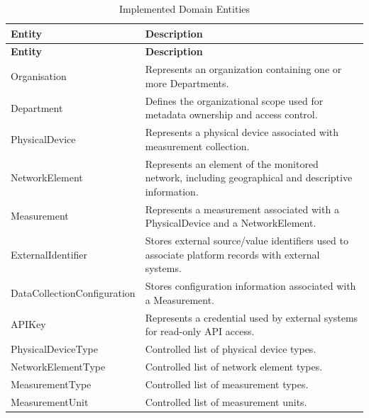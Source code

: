 \documentclass[11pt,a4paper]{article}
\begin{document}
\begin{longtable}{P{4.3cm} P{10.8cm}}
\caption{Implemented Domain Entities}
\label{tab:phase3_entities}\\

\toprule
\textbf{Entity} & \textbf{Description} \\
\midrule
\endfirsthead

\toprule
\textbf{Entity} & \textbf{Description} \\
\midrule
\endhead

\bottomrule
\endfoot

Organisation &
Represents an organization containing one or more
Departments. \\

Department &
Defines the organizational scope used for metadata
ownership and access control. \\

PhysicalDevice &
Represents a physical device associated with
measurement collection. \\

NetworkElement &
Represents an element of the monitored network,
including geographical and descriptive information. \\

Measurement &
Represents a measurement associated with a
PhysicalDevice and a NetworkElement. \\

ExternalIdentifier &
Stores external source/value identifiers used
to associate platform records with external systems. \\

DataCollectionConfiguration &
Stores configuration information associated
with a Measurement. \\

APIKey &
Represents a credential used by external systems
for read-only API access. \\

PhysicalDeviceType &
Controlled list of physical device types. \\

NetworkElementType &
Controlled list of network element types. \\

MeasurementType &
Controlled list of measurement types. \\

MeasurementUnit &
Controlled list of measurement units. \\

\end{longtable}
\end{document}
